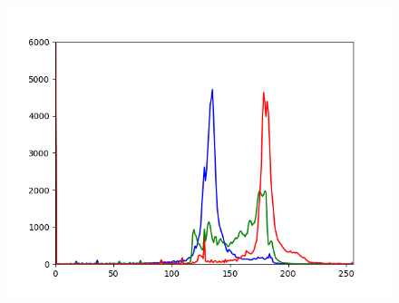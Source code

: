 \documentclass[a4paper,12pt,oneside]{article}
\begin{document}
\begin{figure}[htb]
\begin{minipage}[c]{0.08\textwidth}
\end{minipage}
\hfill
\begin{minipage}[c]{0.3\textwidth}
\includegraphics[width=\textwidth]{Sources/Bild2_HS_histo.png}
\end{minipage}
\end{figure}
\end{document}

